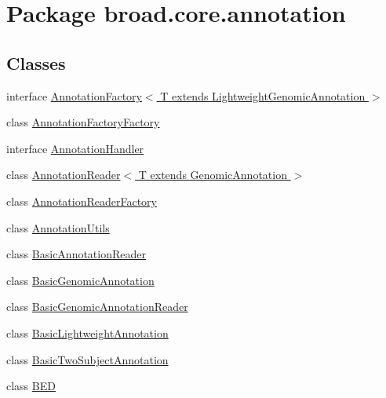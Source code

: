 \hypertarget{namespacebroad_1_1core_1_1annotation}{\section{Package broad.\+core.\+annotation}
\label{namespacebroad_1_1core_1_1annotation}
}
\subsection*{Classes}
\begin{DoxyCompactItemize}
\item 
interface \hyperlink{interfacebroad_1_1core_1_1annotation_1_1_annotation_factory_3_01_t_01extends_01_lightweight_genomic_annotation_01_4}{Annotation\+Factory$<$ T extends Lightweight\+Genomic\+Annotation $>$}
\item 
class \hyperlink{classbroad_1_1core_1_1annotation_1_1_annotation_factory_factory}{Annotation\+Factory\+Factory}
\item 
interface \hyperlink{interfacebroad_1_1core_1_1annotation_1_1_annotation_handler}{Annotation\+Handler}
\item 
class \hyperlink{classbroad_1_1core_1_1annotation_1_1_annotation_reader_3_01_t_01extends_01_genomic_annotation_01_4}{Annotation\+Reader$<$ T extends Genomic\+Annotation $>$}
\item 
class \hyperlink{classbroad_1_1core_1_1annotation_1_1_annotation_reader_factory}{Annotation\+Reader\+Factory}
\item 
class \hyperlink{classbroad_1_1core_1_1annotation_1_1_annotation_utils}{Annotation\+Utils}
\item 
class \hyperlink{classbroad_1_1core_1_1annotation_1_1_basic_annotation_reader}{Basic\+Annotation\+Reader}
\item 
class \hyperlink{classbroad_1_1core_1_1annotation_1_1_basic_genomic_annotation}{Basic\+Genomic\+Annotation}
\item 
class \hyperlink{classbroad_1_1core_1_1annotation_1_1_basic_genomic_annotation_reader}{Basic\+Genomic\+Annotation\+Reader}
\item 
class \hyperlink{classbroad_1_1core_1_1annotation_1_1_basic_lightweight_annotation}{Basic\+Lightweight\+Annotation}
\item 
class \hyperlink{classbroad_1_1core_1_1annotation_1_1_basic_two_subject_annotation}{Basic\+Two\+Subject\+Annotation}
\item 
class \hyperlink{classbroad_1_1core_1_1annotation_1_1_b_e_d}{B\+E\+D}

\end{DoxyCompactItemize}
